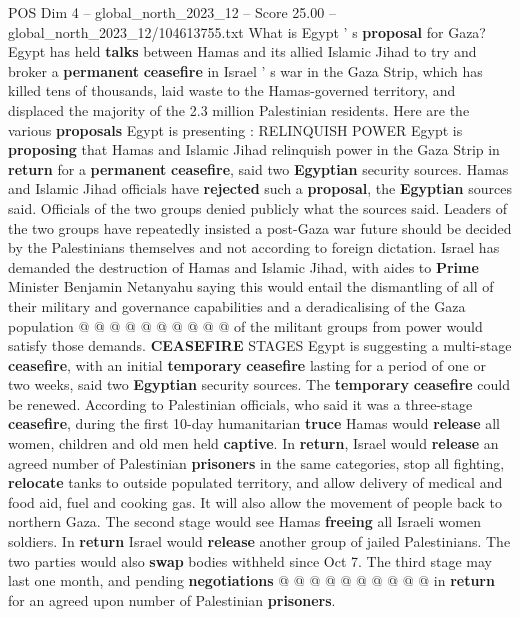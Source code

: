 \begin{textsample}{POS Dim 4 – global\_north\_2023\_12 – Score 25.00 – global\_north\_2023\_12/104613755.txt}  \label{ex:f4_pos_301}
What is Egypt ' s \textbf{proposal} for Gaza?
Egypt has held \textbf{talks} between Hamas and its allied Islamic Jihad to try and broker a \textbf{permanent} \textbf{ceasefire} in Israel ' s war in the Gaza Strip, which has killed tens of thousands, laid waste to the Hamas-governed territory, and displaced the majority of the 2.3 million Palestinian residents.
Here are the various \textbf{proposals} Egypt is presenting : RELINQUISH POWER Egypt is \textbf{proposing} that Hamas and Islamic Jihad relinquish power in the Gaza Strip in \textbf{return} for a \textbf{permanent} \textbf{ceasefire}, said two \textbf{Egyptian} security sources.
Hamas and Islamic Jihad officials have \textbf{rejected} such a \textbf{proposal}, the \textbf{Egyptian} sources said.
Officials of the two groups denied publicly what the sources said.
Leaders of the two groups have repeatedly insisted a post-Gaza war future should be decided by the Palestinians themselves and not according to foreign dictation.
Israel has demanded the destruction of Hamas and Islamic Jihad, with aides to \textbf{Prime} Minister Benjamin Netanyahu saying this would entail the dismantling of all of their military and governance capabilities and a deradicalising of the Gaza population @ @ @ @ @ @ @ @ @ @ of the militant groups from power would satisfy those demands. \textbf{CEASEFIRE} STAGES Egypt is suggesting a multi-stage \textbf{ceasefire}, with an initial \textbf{temporary} \textbf{ceasefire} lasting for a period of one or two weeks, said two \textbf{Egyptian} security sources.
The \textbf{temporary} \textbf{ceasefire} could be renewed.
According to Palestinian officials, who said it was a three-stage \textbf{ceasefire}, during the first 10-day humanitarian \textbf{truce} Hamas would \textbf{release} all women, children and old men held \textbf{captive}.
In \textbf{return}, Israel would \textbf{release} an agreed number of Palestinian \textbf{prisoners} in the same categories, stop all fighting, \textbf{relocate} tanks to outside populated territory, and allow delivery of medical and food aid, fuel and cooking gas.
It will also allow the movement of people back to northern Gaza.
The second stage would see Hamas \textbf{freeing} all Israeli women soldiers.
In \textbf{return} Israel would \textbf{release} another group of jailed Palestinians.
The two parties would also \textbf{swap} bodies withheld since Oct 7.
The third stage may last one month, and pending \textbf{negotiations} @ @ @ @ @ @ @ @ @ @ in \textbf{return} for an agreed upon number of Palestinian \textbf{prisoners}.

\end{textsample}
